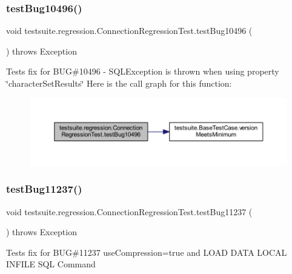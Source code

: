 \subsubsection{\texorpdfstring{test\+Bug10496()}{testBug10496()}}
{\footnotesize\ttfamily void testsuite.\+regression.\+Connection\+Regression\+Test.\+test\+Bug10496 (\begin{DoxyParamCaption}{ }\end{DoxyParamCaption}) throws Exception}

Tests fix for B\+UG\#10496 -\/ S\+Q\+L\+Exception is thrown when using property \char`\"{}character\+Set\+Results\char`\"{} Here is the call graph for this function\+:
\nopagebreak
\begin{figure}[H]
\begin{center}
\leavevmode
\includegraphics[width=350pt]{classtestsuite_1_1regression_1_1_connection_regression_test_a1a46119260190c85a4b8e8acbe3e9279_cgraph}
\end{center}
\end{figure}
\mbox{\label{classtestsuite_1_1regression_1_1_connection_regression_test_a93fc4be2d20938ec5b54e34d3c2eb25c}} 
\subsubsection{\texorpdfstring{test\+Bug11237()}{testBug11237()}}
{\footnotesize\ttfamily void testsuite.\+regression.\+Connection\+Regression\+Test.\+test\+Bug11237 (\begin{DoxyParamCaption}{ }\end{DoxyParamCaption}) throws Exception}

Tests fix for B\+UG\#11237 use\+Compression=true and L\+O\+AD D\+A\+TA L\+O\+C\+AL I\+N\+F\+I\+LE S\+QL Command


